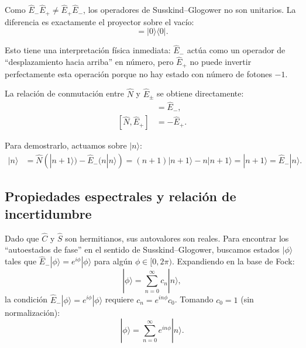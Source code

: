             Como $\hat{E}_{-}\hat{E}_{+} \neq \hat{E}_{+}\hat{E}_{-}$, los operadores de Susskind--Glogower no son unitarios. La diferencia es exactamente el proyector sobre el vacío:
            \begin{equation}
                [\hat{E}_{+}, \hat{E}_{-}] = |0\rangle\langle 0|.
                \label{eq:SG_conmutador}
            \end{equation}
            
            Esto tiene una interpretación física inmediata: $\hat{E}_{-}$ actúa como un operador de ``desplazamiento hacia arriba'' en número, pero $\hat{E}_{+}$ no puede invertir perfectamente esta operación porque no hay estado con número de fotones $-1$.
            
            La relación de conmutación entre $\hat{N}$ y $\hat{E}_{\pm}$ se obtiene directamente:
            \begin{align}
                [\hat{N}, \hat{E}_{-}] &= \hat{E}_{-}, \label{eq:SG_com1}\\
                [\hat{N}, \hat{E}_{+}] &= -\hat{E}_{+}. \label{eq:SG_com2}
            \end{align}
            
            Para demostrarlo, actuamos sobre $|n\rangle$:
            \begin{align}
                [\hat{N}, \hat{E}_{-}]|n\rangle &= \hat{N}(|n+1\rangle) - \hat{E}_{-}(n|n\rangle) = (n+1)|n+1\rangle - n|n+1\rangle = |n+1\rangle = \hat{E}_{-}|n\rangle.
            \end{align}
 
        \subsection{Propiedades espectrales y relación de incertidumbre}
        
            Dado que $\hat{C}$ y $\hat{S}$ son hermitianos, sus autovalores son reales. Para encontrar los ``autoestados de fase'' en el sentido de Susskind--Glogower, buscamos estados $|\phi\rangle$ tales que $\hat{E}_{-}|\phi\rangle = e^{i\phi}|\phi\rangle$ para algún $\phi \in [0, 2\pi)$. Expandiendo en la base de Fock:
            \begin{equation}
                |\phi\rangle = \sum_{n=0}^{\infty} c_n |n\rangle,
            \end{equation}
            la condición $\hat{E}_{-}|\phi\rangle = e^{i\phi}|\phi\rangle$ requiere $c_n = e^{in\phi} c_0$. Tomando $c_0 = 1$ (sin normalización):
            \begin{equation}
                |\phi\rangle = \sum_{n=0}^{\infty} e^{in\phi} |n\rangle.
                \label{eq:SG_autoestado}
            \end{equation}
            
